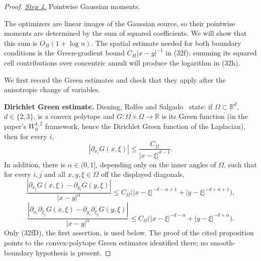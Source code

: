 \documentclass{aomart}
\theoremstyle{definition}
\newcommand{\1}{\mathbf 1}
\begin{document}
\begin{proof}
\smallskip\noindent
\underline{\textit{Step 4.}} Pointwise Gaussian moments.

The optimizers are linear images of the Gaussian source, so their
pointwise moments are determined by the sum of squared coefficients.
We will show that this sum is $O_H(1+\log n)$.  The spatial estimate
needed for both boundary conditions is the Green-gradient bound
$C_H|x-y|^{-1}$ in (32f): summing its squared cell contributions over
concentric annuli will produce the logarithm in (32h).

We first record the Green estimates and check that they apply after
the anisotropic change of variables.

\textbf{Dirichlet Green estimate.}  Diening, Rolfes and Salgado~\cite[Proposition 4.1]{DRS2024} state: if
$\Omega\subset\mathbb R^d$, $d\in\{2,3\}$, is a convex polytope and
$G:\Omega\times\Omega\to\mathbb R$ is its Green function (in the
paper's $W^{1,2}_ 0$ framework, hence the Dirichlet Green function of
the Laplacian), then for every $i$,
\begin{equation}
|\partial_ {x_ i}G(x,\xi)|\leq \frac{C_\Omega}{|x-\xi|^{d-1}}.
\tag{32fD}
\end{equation}
In addition, there is $\alpha\in(0,1]$, depending only on the inner
angles of $\Omega$, such that for every $i,j$ and all
$x,y,\xi\in\Omega$ off the displayed diagonals,
\begin{equation*}
\frac{|\partial_{x_i}G(x,\xi)-\partial_{y_i}G(y,\xi)|}{|x-y|^\alpha}
\leq C_ \Omega\bigl(
|x-\xi|^{-d-\alpha+1}+|y-\xi|^{-d+\alpha+1}\bigr),
\end{equation*}
\begin{equation*}
\frac{|\partial_{x_i}\partial_{\xi_j}G(x,\xi)-\partial_{y_i}\partial_{\xi_j}G(y,\xi)|}{|x-y|^\alpha}
\leq C_ \Omega\bigl(
|x-\xi|^{-d-\alpha}+|y-\xi|^{-d+\alpha}\bigr).
\end{equation*}
Only (32fD), the first assertion, is used below.  The proof of the cited
proposition points to the convex-polytope Green estimates identified there;
no smooth-boundary hypothesis is present.


\end{proof}
\end{document}
